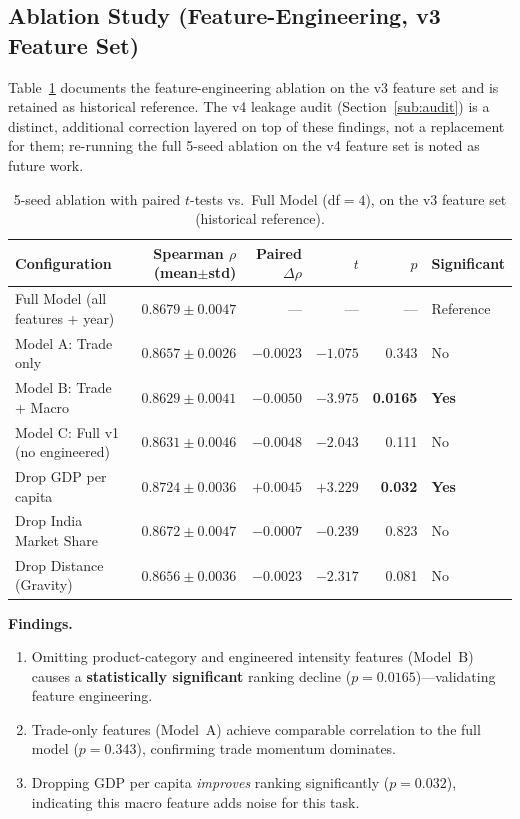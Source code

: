 \documentclass[conference]{IEEEtran}
\begin{document}
\subsection{Ablation Study (Feature-Engineering, v3 Feature Set)}
Table~\ref{tab:ablation} documents the feature-engineering ablation on the
v3 feature set and is retained as historical reference. The v4 leakage
audit (Section~\ref{sub:audit}) is a distinct, additional correction layered
on top of these findings, not a replacement for them; re-running the full
5-seed ablation on the v4 feature set is noted as future work.
\begin{table}[t]
\centering
\caption{5-seed ablation with paired $t$-tests vs.\ Full Model (df$=4$),
on the v3 feature set (historical reference).}
\label{tab:ablation}
\begin{tabular}{@{}lrrrrl@{}}
\toprule
\textbf{Configuration} & \textbf{Spearman $\rho$ (mean$\pm$std)} &
\textbf{Paired $\Delta\rho$} & \textbf{$t$} & \textbf{$p$} &
\textbf{Significant} \\
\midrule
Full Model (all features + year)  & $0.8679 \pm 0.0047$ & ---      & ---    & ---            & Reference \\
Model A: Trade only               & $0.8657 \pm 0.0026$ & $-0.0023$ & $-1.075$ & 0.343        & No \\
Model B: Trade + Macro            & $0.8629 \pm 0.0041$ & $-0.0050$ & $-3.975$ & \textbf{0.0165} & \textbf{Yes} \\
Model C: Full v1 (no engineered)  & $0.8631 \pm 0.0046$ & $-0.0048$ & $-2.043$ & 0.111        & No \\
Drop GDP per capita               & $0.8724 \pm 0.0036$ & $+0.0045$ & $+3.229$ & \textbf{0.032}  & \textbf{Yes} \\
Drop India Market Share           & $0.8672 \pm 0.0047$ & $-0.0007$ & $-0.239$ & 0.823        & No \\
Drop Distance (Gravity)           & $0.8656 \pm 0.0036$ & $-0.0023$ & $-2.317$ & 0.081        & No \\
\bottomrule
\end{tabular}
\end{table}

\noindent\textbf{Findings.}
\begin{enumerate}
\item Omitting product-category and engineered intensity features
(Model~B) causes a \textbf{statistically significant} ranking decline
($p=0.0165$)---validating feature engineering.
\item Trade-only features (Model~A) achieve comparable correlation to the
full model ($p=0.343$), confirming trade momentum dominates.
\item Dropping GDP per capita \emph{improves} ranking significantly
($p=0.032$), indicating this macro feature adds noise for this task.
\end{enumerate}
\end{document}
